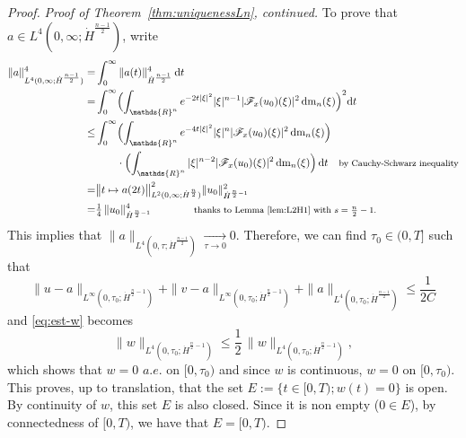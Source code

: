 \documentclass[a4paper, 12pt]{article}
\theoremstyle{plain}
\theoremstyle{definition}
\theoremstyle{remark}
\numberwithin{equation}{section}
\begin{document}
\begin{proof}
\noindent
{\it Proof of Theorem~\ref{thm:uniquenessLn}, continued.}
To prove that $a\in L^4(0,\infty;\dot H^{\frac{n-1}{2}})$, write
%
\begin{align*}
\|a\|_{L^4(0,\infty;\dot H^{\frac{n-1}{2}})}^4=& \int_0^\infty \|a(t)\|_{\dot H^{\frac{n-1}{2}}}^4\,{\rm d}t\\
=&\int_0^\infty \Bigl(\int_{{\mathds{R}}^n}e^{-2t|\xi|^2} |\xi|^{n-1}|{\mathscr{F}}_x(u_0)(\xi)|^2\,{\rm dm}_n(\xi)\Bigr)^2{\rm d}t\\
\le & \int_0^\infty\Bigl(\int_{{\mathds{R}}^n}e^{-4t|\xi|^2}|\xi|^n|{\mathscr{F}}_x(u_0)(\xi)|^2\,{\rm dm}_n(\xi)\Bigr)\\
& \qquad \cdot \Bigl(\int_{{\mathds{R}}^n}|\xi|^{n-2}|{\mathscr{F}}_x(u_0)(\xi)|^2\,{\rm dm}_n(\xi)\Bigr)\,{\rm d}t
\quad\mbox{\footnotesize by Cauchy-Schwarz inequality}\\
= & \bigl\|t\mapsto a(2t)\bigr\|_{L^2(0,\infty;\dot H^{\frac{n}{2}})}^2 \|u_0\|_{\dot H^{\frac{n}{2}-1}}^2 \\
=& \tfrac{1}{4}\,\|u_0\|_{\dot H^{\frac{n}{2}-1}}^4\qquad\qquad \mbox{\footnotesize thanks to Lemma~\ref{lem:L2H1} with $s=\tfrac{n}{2}-1$.}
\end{align*}
%
This implies that $\|a\|_{L^4(0,\tau;\dot H^{\frac{n-1}{2}})}\xrightarrow[\tau\to 0]{}0$.
Therefore, we can find $\tau_0\in(0,T]$ such that
\[
\|u-a\|_{L^\infty(0,\tau_0;\dot H^{\frac{n}{2}-1})}+\|v-a\|_{L^\infty(0,\tau_0;\dot H^{\frac{n}{2}-1})}
+\|a\|_{L^4(0,\tau_0;\dot H^{\frac{n-1}{2}})}\le\textstyle{\frac{1}{2C}}
\]
and \eqref{eq:est-w} becomes 
\[
\|w\|_{L^4(0,\tau_0;\dot H^{\frac{n}{2}-1})}\le\textstyle{\frac{1}{2}}\,\|w\|_{L^4(0,\tau_0;\dot H^{\frac{n}{2}-1})},
\]
which shows that $w=0$ $a.e.$ on $[0,\tau_0)$ and since $w$ is continuous, $w=0$ on $[0,\tau_0)$. This proves, up to translation,
that the set $E:=\{t\in [0,T);w(t)=0\}$ is open. By continuity of $w$, this set $E$ is also closed. Since it is non empty ($0\in E$), 
by connectedness of $[0,T)$, we have that $E=[0,T)$.
\end{proof}

\end{document}
